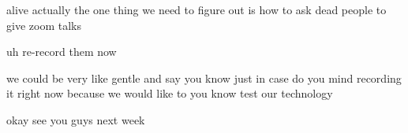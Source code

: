 \begin{description}
alive actually the one thing we need to figure out is how to ask dead people to give zoom talks

uh re-record them now

we could be very like gentle and say you know just in case do you mind recording it right now because we would like to you know test our technology

okay see you guys next week





\end{description}



\printbibliography[heading=subbibintoc,title={References}]
